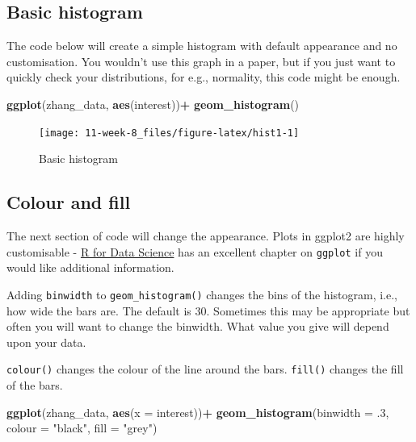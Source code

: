 \documentclass[]{book}
\newenvironment{Shaded}{\begin{snugshade}}{\end{snugshade}}
\newcommand{\DataTypeTok}[1]{\textcolor[rgb]{0.13,0.29,0.53}{#1}}
\newcommand{\FloatTok}[1]{\textcolor[rgb]{0.00,0.00,0.81}{#1}}
\newcommand{\KeywordTok}[1]{\textcolor[rgb]{0.13,0.29,0.53}{\textbf{#1}}}
\newcommand{\NormalTok}[1]{#1}
\newcommand{\OperatorTok}[1]{\textcolor[rgb]{0.81,0.36,0.00}{\textbf{#1}}}
\newcommand{\StringTok}[1]{\textcolor[rgb]{0.31,0.60,0.02}{#1}}
\begin{document}
\hypertarget{basic-histogram}{%
\subsection{Basic histogram}\label{basic-histogram}}

The code below will create a simple histogram with default appearance and no customisation. You wouldn't use this graph in a paper, but if you just want to quickly check your distributions, for e.g., normality, this code might be enough.

\begin{Shaded}
\begin{Highlighting}[]
\KeywordTok{ggplot}\NormalTok{(zhang_data, }\KeywordTok{aes}\NormalTok{(interest))}\OperatorTok{+}\StringTok{ }
\StringTok{  }\KeywordTok{geom_histogram}\NormalTok{()}
\end{Highlighting}
\end{Shaded}

\begin{figure}

{\centering \texttt{[image: 11-week-8\_files/figure-latex/hist1-1]} 

}

\caption{Basic histogram}\label{fig:hist1}
\end{figure}

\hypertarget{colour-and-fill}{%
\subsection{Colour and fill}\label{colour-and-fill}}

The next section of code will change the appearance. Plots in ggplot2 are highly customisable - \href{https://r4ds.had.co.nz/data-visualisation.html}{R for Data Science} has an excellent chapter on \texttt{ggplot} if you would like additional information.

Adding \texttt{binwidth} to \texttt{geom\_histogram()} changes the bins of the histogram, i.e., how wide the bars are. The default is 30. Sometimes this may be appropriate but often you will want to change the binwidth. What value you give will depend upon your data.

\texttt{colour()} changes the colour of the line around the bars. \texttt{fill()} changes the fill of the bars.

\begin{Shaded}
\begin{Highlighting}[]
\KeywordTok{ggplot}\NormalTok{(zhang_data, }\KeywordTok{aes}\NormalTok{(}\DataTypeTok{x =}\NormalTok{ interest))}\OperatorTok{+}\StringTok{ }
\StringTok{  }\KeywordTok{geom_histogram}\NormalTok{(}\DataTypeTok{binwidth =} \FloatTok{.3}\NormalTok{, }
                 \DataTypeTok{colour =} \StringTok{"black"}\NormalTok{,  }
                 \DataTypeTok{fill =} \StringTok{"grey"}\NormalTok{) }
\end{Highlighting}
\end{Shaded}
\end{document}
